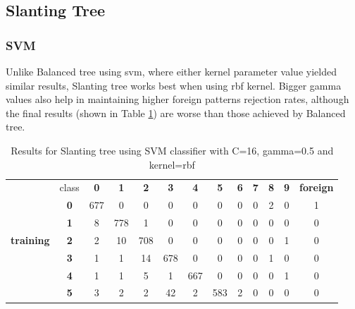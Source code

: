 \subsection{Slanting Tree}

\subsubsection{SVM}

Unlike Balanced tree using svm, where either kernel parameter value yielded similar results, Slanting tree works best when using rbf kernel. Bigger gamma values also help in maintaining higher foreign patterns rejection rates, although the final results (shown in Table \ref{slanting_tree_svm_results}) are worse than those achieved by Balanced tree.

\begin{table}[htp]
	\centering
	\caption{Results for Slanting tree using SVM classifier with C=16, gamma=0.5 and kernel=rbf}
	\label{slanting_tree_svm_results}
	\begin{tabular}{|c|c|c|c|c|c|c|c|c|c|c|c|c|}
		\hline
		\multirow{11}{*}{\textbf{training}} & class      & \textbf{0} & \textbf{1} & \textbf{2} & \textbf{3} & \textbf{4} & \textbf{5} & \textbf{6} & \textbf{7} & \textbf{8} & \textbf{9} & \textbf{foreign} \\ \cline{2-13} 
		& \textbf{0} & 677        & 0          & 0          & 0          & 0          & 0          & 0          & 0          & 2          & 0          & 1                \\ \cline{2-13} 
		& \textbf{1} & 8          & 778        & 1          & 0          & 0          & 0          & 0          & 0          & 0          & 0          & 0                \\ \cline{2-13} 
		& \textbf{2} & 2          & 10         & 708        & 0          & 0          & 0          & 0          & 0          & 0          & 1          & 0                \\ \cline{2-13} 
		& \textbf{3} & 1          & 1          & 14         & 678        & 0          & 0          & 0          & 0          & 1          & 0          & 0                \\ \cline{2-13} 
		& \textbf{4} & 1          & 1          & 5          & 1          & 667        & 0          & 0          & 0          & 0          & 1          & 0                \\ \cline{2-13} 
		& \textbf{5} & 3          & 2          & 2          & 42         & 2          & 583        & 2          & 0          & 0          & 0          & 0                \\ \cline{2-13} 

\end{tabular}
\end{table}
